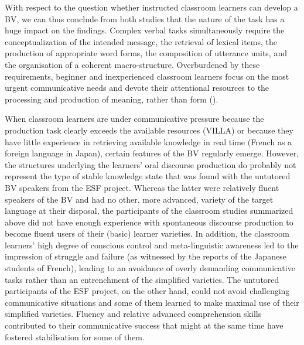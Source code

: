 \documentclass[output=paper]{langscibook}
\begin{document}
With respect to the question whether instructed classroom learners can develop a BV, we can thus conclude from both studies that the nature of the task has a huge impact on the findings. Complex verbal tasks simultaneously require the conceptualization of the intended message, the retrieval of lexical items, the production of appropriate word forms, the composition of utterance units, and the organisation of a coherent macro-structure. Overburdened by these requirements, beginner and inexperienced classroom learners focus on the most urgent communicative needs and devote their attentional resources to the processing and production of meaning, rather than form (\citealt{SkehanFoster2001, VanPattenBenati2015, Saturno2020}). 

When\largerpage{} classroom learners are under communicative pressure because the production task clearly exceeds the available resources (VILLA) or because they have little experience in retrieving available knowledge in real time (French as a foreign language in Japan), certain features of the BV regularly emerge. However, the structures underlying the learners’ oral discourse production do probably not represent the type of stable knowledge state that was found with the untutored BV speakers from the ESF project. Whereas the latter were relatively fluent speakers of the BV and had no other, more advanced, variety of the target language at their disposal, the participants of the classroom studies summarized above did not have enough experience with spontaneous discourse production to become fluent users of their (basic) learner varieties.  In addition, the classroom learners’ high degree of conscious control and meta-linguistic awareness led to the impression of struggle and failure (as witnessed by the reports of the Japanese students of French), leading to an avoidance of overly demanding communicative tasks rather than an entrenchment of the simplified varieties. The untutored participants of the ESF project, on the other hand, could not avoid challenging communicative situations and some of them learned to make maximal use of their simplified varieties. Fluency and relative advanced comprehension skills contributed to their communicative success that might at the same time have fostered stabilisation for some of them.
\end{document}
